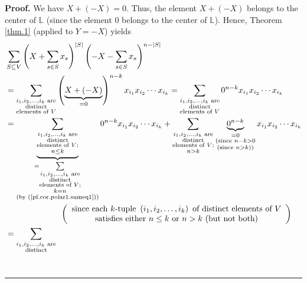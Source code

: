 \documentclass[numbers=enddot,12pt,final,onecolumn,notitlepage]{scrartcl}%
\theoremstyle{definition}
\newenvironment{proof}[1][Proof]{\noindent\textbf{#1.} }{\ \rule{0.5em}{0.5em}}
\let\sumnonlimits\sum
\renewcommand{\sum}{\sumnonlimits\limits}
\newenvironment{verlong}{}{}
\begin{document}
\begin{verlong}
\begin{proof}
We have $X+\left(  -X\right)  =0$. Thus, the element $X+\left(  -X\right)  $
belongs to the center of $\mathbb{L}$ (since the element $0$ belongs to the
center of $\mathbb{L}$). Hence, Theorem \ref{thm.1} (applied to $Y=-X$) yields%
\begin{align*}
&  \sum_{S\subseteq V}\left(  X+\sum_{s\in S}x_{s}\right)  ^{\left\vert
S\right\vert }\left(  -X-\sum_{s\in S}x_{s}\right)  ^{n-\left\vert
S\right\vert }\\
&  =\sum_{\substack{i_{1},i_{2},\ldots,i_{k}\text{ are}\\\text{distinct}%
\\\text{elements of }V}}\left(  \underbrace{X+\left(  -X\right)  }%
_{=0}\right)  ^{n-k}x_{i_{1}}x_{i_{2}}\cdots x_{i_{k}}=\sum_{\substack{i_{1}%
,i_{2},\ldots,i_{k}\text{ are}\\\text{distinct}\\\text{elements of }V}%
}0^{n-k}x_{i_{1}}x_{i_{2}}\cdots x_{i_{k}}\\
&  =\underbrace{\sum_{\substack{i_{1},i_{2},\ldots,i_{k}\text{ are}%
\\\text{distinct}\\\text{elements of }V;\\n\leq k}}}_{\substack{=\sum
_{\substack{i_{1},i_{2},\ldots,i_{k}\text{ are}\\\text{distinct}%
\\\text{elements of }V;\\k=n}}\\\text{(by (\ref{pf.cor.polar1.sumeq1}))}%
}}0^{n-k}x_{i_{1}}x_{i_{2}}\cdots x_{i_{k}}+\sum_{\substack{i_{1},i_{2}%
,\ldots,i_{k}\text{ are}\\\text{distinct}\\\text{elements of }V;\\n>k}%
}\underbrace{0^{n-k}}_{\substack{=0\\\text{(since }n-k>0\\\text{(since
}n>k\text{))}}}x_{i_{1}}x_{i_{2}}\cdots x_{i_{k}}\\
&  \ \ \ \ \ \ \ \ \ \ \ \ \ \ \ \ \ \ \ \ \left(
\begin{array}
[c]{c}%
\text{since each }k\text{-tuple }\left(  i_{1},i_{2},\ldots,i_{k}\right)
\text{ of distinct elements of }V\\
\text{satisfies either }n\leq k\text{ or }n>k\text{ (but not both)}%
\end{array}
\right) \\
&  =\sum_{\substack{i_{1},i_{2},\ldots,i_{k}\text{ are}\\\text{distinct}%
}}
\end{align*}
\end{proof}
\end{verlong}
\end{document}
